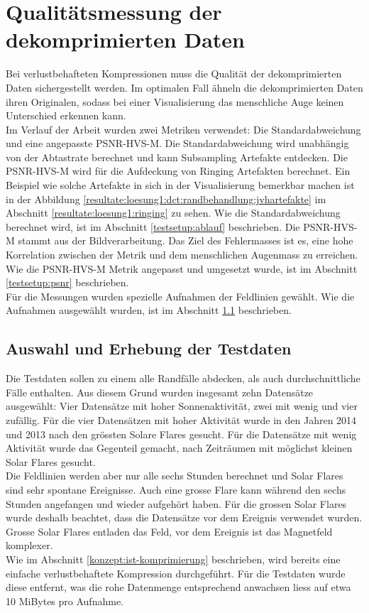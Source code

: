 \section{Qualitätsmessung der dekomprimierten Daten}
Bei verlustbehafteten Kompressionen muss die Qualität der dekomprimierten Daten sichergestellt werden. Im optimalen Fall ähneln die dekomprimierten Daten ihren Originalen, sodass bei einer Visualisierung das menschliche Auge keinen Unterschied erkennen kann.\\
Im Verlauf der Arbeit wurden zwei Metriken verwendet: Die Standardabweichung und eine angepasste PSNR-HVS-M. Die Standardabweichung wird unabhängig von der Abtastrate berechnet und kann Subsampling Artefakte entdecken. Die PSNR-HVS-M wird für die Aufdeckung von Ringing Artefakten\cite{wiki:ringing:artefacts} berechnet. Ein Beispiel wie solche Artefakte in sich in der Visualisierung bemerkbar machen ist in der Abbildung \ref{resultate:loesung1:dct:randbehandlung:jvhartefakte} im Abschnitt \ref{resultate:loesung1:ringing} zu sehen. Wie die Standardabweichung berechnet wird, ist im Abschnitt \ref{testsetup:ablauf} beschrieben. Die PSNR-HVS-M stammt aus der Bildverarbeitung. Das Ziel des Fehlermasses ist es, eine hohe Korrelation zwischen der Metrik und dem menschlichen Augenmass zu erreichen. Wie die PSNR-HVS-M Metrik angepasst und umgesetzt wurde, ist im Abschnitt \ref{testsetup:psnr} beschrieben.\\
Für die Messungen wurden spezielle Aufnahmen der Feldlinien gewählt. Wie die Aufnahmen ausgewählt wurden, ist im Abschnitt \ref{testsetup:auswahl_erhebung} beschrieben.

\subsection{Auswahl und Erhebung der Testdaten}\label{testsetup:auswahl_erhebung}
Die Testdaten sollen zu einem alle Randfälle abdecken, als auch durchschnittliche Fälle enthalten. Aus diesem Grund wurden insgesamt zehn Datensätze ausgewählt: Vier Datensätze mit hoher Sonnenaktivität, zwei mit wenig und vier zufällig. Für die vier Datensätzen mit hoher Aktivität wurde in den Jahren 2014 und 2013 nach den grössten Solare Flares gesucht. Für die Datensätze mit wenig Aktivität wurde das Gegenteil gemacht, nach Zeiträumen mit möglichst kleinen Solar Flares gesucht.\\
Die Feldlinien werden aber nur alle sechs Stunden berechnet und Solar Flares sind sehr spontane Ereignisse. Auch eine grosse Flare kann während den sechs Stunden angefangen und wieder aufgehört haben. Für die grossen Solar Flares wurde deshalb beachtet, dass die Datensätze vor dem Ereignis verwendet wurden. Grosse Solar Flares entladen das Feld, vor dem Ereignis ist das Magnetfeld komplexer.\\
[\baselineskip]
Wie im Abschnitt \ref{konzept:ist-komprimierung} beschrieben, wird bereits eine einfache verlustbehaftete Kompression durchgeführt. Für die Testdaten wurde diese entfernt, was die rohe Datenmenge entsprechend anwachsen liess auf etwa 10 MiBytes pro Aufnahme.

